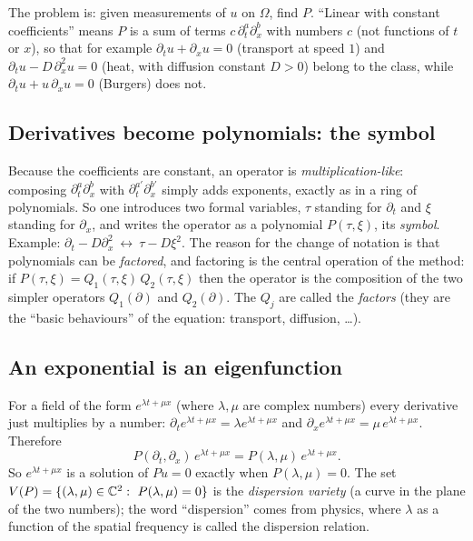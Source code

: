 \documentclass[11pt,a4paper]{article}
\theoremstyle{definition}
\begin{document}
The problem is: given measurements of $u$ on $\Omega$, find $P$. ``Linear with constant coefficients'' means $P$ is a sum of terms $c\,\partial_t^a\partial_x^b$ with numbers $c$ (not functions of $t$ or $x$), so that for example $\partial_t u+\partial_xu=0$ (transport at speed $1$) and $\partial_tu-D\,\partial_x^2u=0$ (heat, with diffusion constant $D>0$) belong to the class, while $\partial_tu+u\,\partial_xu=0$ (Burgers) does not.

\subsection{Derivatives become polynomials: the symbol}
Because the coefficients are constant, an operator is \emph{multiplication-like}: composing $\partial_t^a\partial_x^b$ with $\partial_t^{a'}\partial_x^{b'}$ simply adds exponents, exactly as in a ring of polynomials. So one introduces two formal variables, $\tau$ standing for $\partial_t$ and $\xi$ standing for $\partial_x$, and writes the operator as a polynomial $P(\tau,\xi)$, its \emph{symbol}. Example: $\partial_t-D\partial_x^2\ \leftrightarrow\ \tau-D\xi^2$. The reason for the change of notation is that polynomials can be \emph{factored}, and factoring is the central operation of the method: if $P(\tau,\xi)=Q_1(\tau,\xi)\,Q_2(\tau,\xi)$ then the operator is the composition of the two simpler operators $Q_1(\partial)$ and $Q_2(\partial)$. The $Q_j$ are called the \emph{factors} (they are the ``basic behaviours'' of the equation: transport, diffusion, \dots).

\subsection{An exponential is an eigenfunction}
For a field of the form $e^{\lambda t+\mu x}$ (where $\lambda,\mu$ are complex numbers) every derivative just multiplies by a number: $\partial_te^{\lambda t+\mu x}=\lambda e^{\lambda t+\mu x}$ and $\partial_xe^{\lambda t+\mu x}=\mu\, e^{\lambda t+\mu x}$. Therefore
\begin{equation}\label{eq:eigen}
P(\partial_t,\partial_x)\,e^{\lambda t+\mu x}=P(\lambda,\mu)\,e^{\lambda t+\mu x}.
\end{equation}
So $e^{\lambda t+\mu x}$ is a solution of $Pu=0$ exactly when $P(\lambda,\mu)=0$. The set $V(P)=\{(\lambda,\mu)\in\C^2:\ P(\lambda,\mu)=0\}$ is the \emph{dispersion variety} (a curve in the plane of the two numbers); the word ``dispersion'' comes from physics, where $\lambda$ as a function of the spatial frequency is called the dispersion relation.
\end{document}
